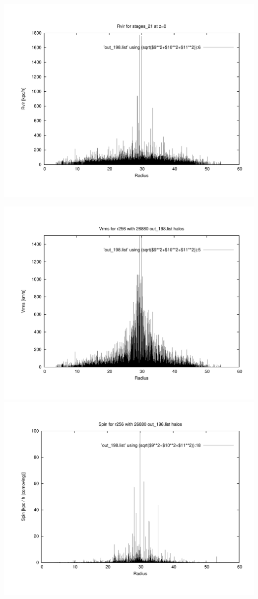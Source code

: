 \includegraphics[scale=0.3]{stages_21/plot_rvir_z0.pdf}

\includegraphics[scale=0.3]{stages_21/plot_Vrms_out_198.pdf}
\includegraphics[scale=0.3]{stages_21/plot_spin_out_198.pdf}

